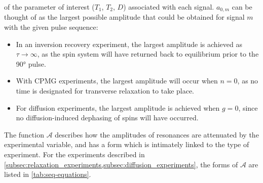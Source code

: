 of the parameter of interest ($T_1$,  $T_2$, $D$) associated with
each signal. $a_{0,m}$ can be thought of as the largest
possible amplitude that could be obtained for signal $m$ with the given
pulse sequence:
\begin{itemize}
    \item In an inversion recovery experiment, the largest amplitude is
        achieved as $\tau \rightarrow \infty$, as the spin system will have
        returned back to equilibrium prior to the \ang{90} pulse.
    \item With \ac{CPMG} experiments, the largest amplitude will occur when
        $n = 0$, as no time is designated for transverse
        relaxation to take place.
    \item For diffusion experiments, the largest amplitude is achieved when
        $g=0$, since no diffusion-induced dephasing of spins will have
        occurred.
\end{itemize}
The function $\mathcal{A}$ describes how the amplitudes of resonances are
attenuated by the experimental variable, and has a form which is intimately
linked to the type of experiment. For the experiments described in
\cref{subsec:relaxation_experiments,subsec:diffusion_experiments},
the forms of $\mathcal{A}$ are listed in \cref{tab:seq-equations}.
